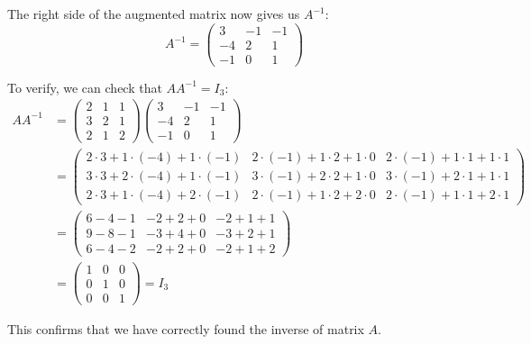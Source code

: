 The right side of the augmented matrix now gives us $A^{-1}$:
\begin{equation*}
A^{-1} = 
\begin{pmatrix}
3 & -1 & -1 \\
-4 & 2 & 1 \\
-1 & 0 & 1
\end{pmatrix}
\end{equation*}

To verify, we can check that $AA^{-1} = I_3$:
\begin{align*}
AA^{-1} &= 
\begin{pmatrix}
2 & 1 & 1 \\
3 & 2 & 1 \\
2 & 1 & 2
\end{pmatrix}
\begin{pmatrix}
3 & -1 & -1 \\
-4 & 2 & 1 \\
-1 & 0 & 1
\end{pmatrix} \\
&= 
\begin{pmatrix}
2 \cdot 3 + 1 \cdot (-4) + 1 \cdot (-1) & 2 \cdot (-1) + 1 \cdot 2 + 1 \cdot 0 & 2 \cdot (-1) + 1 \cdot 1 + 1 \cdot 1 \\
3 \cdot 3 + 2 \cdot (-4) + 1 \cdot (-1) & 3 \cdot (-1) + 2 \cdot 2 + 1 \cdot 0 & 3 \cdot (-1) + 2 \cdot 1 + 1 \cdot 1 \\
2 \cdot 3 + 1 \cdot (-4) + 2 \cdot (-1) & 2 \cdot (-1) + 1 \cdot 2 + 2 \cdot 0 & 2 \cdot (-1) + 1 \cdot 1 + 2 \cdot 1
\end{pmatrix} \\
&= 
\begin{pmatrix}
6 - 4 - 1 & -2 + 2 + 0 & -2 + 1 + 1 \\
9 - 8 - 1 & -3 + 4 + 0 & -3 + 2 + 1 \\
6 - 4 - 2 & -2 + 2 + 0 & -2 + 1 + 2
\end{pmatrix} \\
&= 
\begin{pmatrix}
1 & 0 & 0 \\
0 & 1 & 0 \\
0 & 0 & 1
\end{pmatrix} = I_3
\end{align*}

This confirms that we have correctly found the inverse of matrix $A$.

